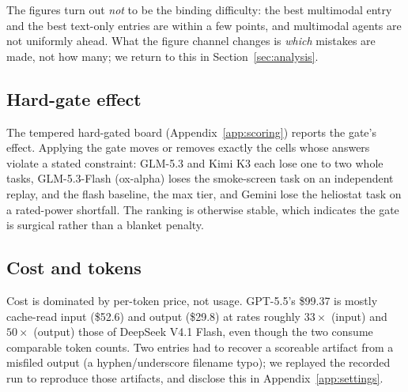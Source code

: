 The figures turn out \emph{not} to be the binding difficulty: the best multimodal entry and the best text-only entries are within a few points, and multimodal agents are not uniformly ahead. What the figure channel changes is \emph{which} mistakes are made, not how many; we return to this in Section~\ref{sec:analysis}.

\subsection{Hard-gate effect}
The tempered hard-gated board (Appendix~\ref{app:scoring}) reports the gate's effect. Applying the gate moves or removes exactly the cells whose answers violate a stated constraint: GLM-5.3 and Kimi K3 each lose one to two whole tasks, GLM-5.3-Flash (ox-alpha) loses the smoke-screen task on an independent replay, and the flash baseline, the max tier, and Gemini lose the heliostat task on a rated-power shortfall. The ranking is otherwise stable, which indicates the gate is surgical rather than a blanket penalty.

\subsection{Cost and tokens}
Cost is dominated by per-token price, not usage. GPT-5.5's \$99.37 is mostly cache-read input (\$52.6) and output (\$29.8) at rates roughly $33\times$ (input) and $50\times$ (output) those of DeepSeek V4.1 Flash, even though the two consume comparable token counts. Two entries had to recover a scoreable artifact from a misfiled output (a hyphen/underscore filename typo); we replayed the recorded run to reproduce those artifacts, and disclose this in Appendix~\ref{app:settings}.
